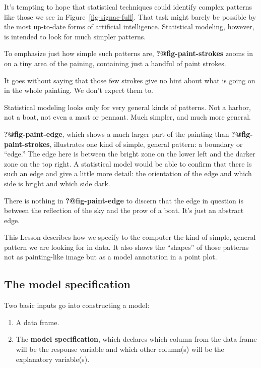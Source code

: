 \documentclass[
  letterpaper,
  DIV=11,
  numbers=noendperiod,
  oneside]{scrartcl}
\providecommand{\tightlist}{%
  \setlength{\itemsep}{0pt}\setlength{\parskip}{0pt}}\usepackage{longtable,booktabs,array}
\begin{document}
It's tempting to hope that statistical techniques could identify complex
patterns like those we see in Figure~\ref{fig-signac-full}. That task
might barely be possible by the most up-to-date forms of artificial
intelligence. Statistical modeling, however, is intended to look for
much simpler patterns.

To emphasize just how simple such patterns are,
\textbf{?@fig-paint-strokes} zooms in on a tiny area of the paining,
containing just a handful of paint strokes.

It goes without saying that those few strokes give no hint about what is
going on in the whole painting. We don't expect them to.

Statistical modeling looks only for very general kinds of patterns. Not
a harbor, not a boat, not even a mast or pennant. Much simpler, and much
more general.

\textbf{?@fig-paint-edge}, which shows a much larger part of the
painting than \textbf{?@fig-paint-strokes}, illustrates one kind of
simple, general pattern: a boundary or ``edge.'' The edge here is
between the bright zone on the lower left and the darker zone on the top
right. A statistical model would be able to confirm that there is such
an edge and give a little more detail: the orientation of the edge and
which side is bright and which side dark.

There is nothing in \textbf{?@fig-paint-edge} to discern that the edge
in question is between the reflection of the sky and the prow of a boat.
It's just an abstract edge.

This Lesson describes how we specify to the computer the kind of simple,
general pattern we are looking for in data. It also shows the ``shapes''
of those patterns not as painting-like image but as a model annotation
in a point plot.

\subsection{The model specification}\label{the-model-specification}

Two basic inputs go into constructing a model:

\begin{enumerate}
\def\labelenumi{\arabic{enumi}.}
\tightlist
\item
  A data frame.
\item
  The \textbf{model specification}, which declares which column from the
  data frame will be the response variable and which other column(s)
  will be the explanatory variable(s).
\end{enumerate}
\end{document}
